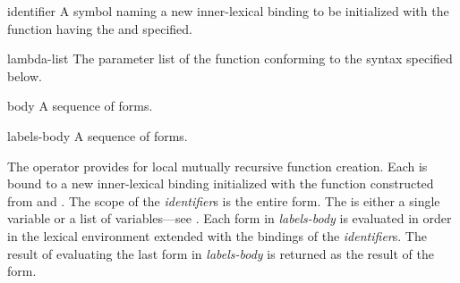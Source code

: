 \begin{optDefinition}
%
\Syntax
{}%
%
\begin{arguments}
    \item[identifier] A symbol naming a new inner-lexical binding to be
    initialized with the function having the  and 
    specified.

    \item[lambda-list] The parameter list of the function conforming to the
    syntax specified below.

    \item[body] A sequence of forms.

    \item[labels-body] A sequence of forms.
\end{arguments}
%
\result%
The  operator provides for local mutually recursive function
creation.  Each  is bound to a new inner-lexical binding
initialized with the function constructed from  and .
The scope of the {\em identifier}s is the entire 
form.  The
 is either a single variable or a list of variables---see
.  Each form in {\em labels-body} is evaluated in order in
the lexical environment extended with the bindings of the {\em identifier}s.
The result of evaluating the last form in {\em labels-body}\/ is returned as the
result of the  form.


\end{optDefinition}
